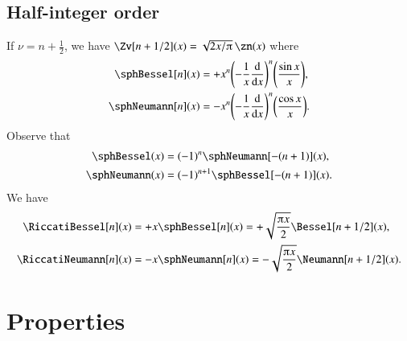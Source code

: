     \subsection{Half-integer order}
        If $\nu=n+\frac{1}{2}$, we have $\Zv[n+1/2](x) = \sqrt{2x/\ppi}\, \zn(x)$ where
        \begin{subequations}
            \begin{align}
                \sphBessel[n](x) &= +x^n \pclosed{-\frac{1}{x} \dv{}{x}}^n \pclosed{ \frac{\sin{x}}{x}}  ,\\
                \sphNeumann[n](x) &= - x^n \pclosed{-\frac{1}{x} \dv{}{x}}^n \pclosed{ \frac{\cos{x}}{x}}.
            \end{align}
        \end{subequations}
        Observe that 
        \begin{subequations}
            \begin{align}
                \sphBessel(x) &= (-1)^n \sphNeumann[-(n+1)](x), \\
                \sphNeumann(x) &= (-1)^{n+1} \sphBessel[-(n+1)](x). \\
            \end{align}
        \end{subequations}
        We have
        \begin{subequations}\label{eq:cylinder:Riccati_Bessel}
            \begin{align}
                \RiccatiBessel[n](x) &= +x\sphBessel[n](x) = +\sqrt{\frac{\ppi x}{2}} \Bessel[n+1/2](x),\\
                \RiccatiNeumann[n](x) &= -x\sphNeumann[n](x)  = -\sqrt{\frac{\ppi x}{2}} \Neumann[n+1/2](x).
            \end{align}
        \end{subequations}

        







\section{Properties}

